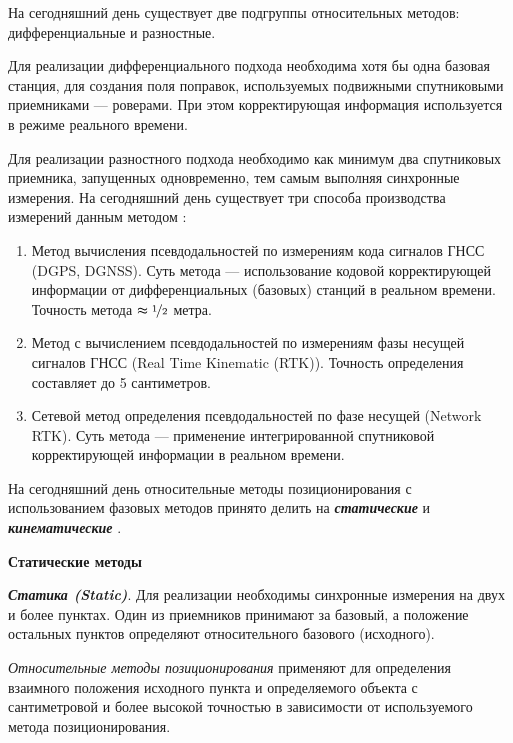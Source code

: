 На сегодняшний день существует две подгруппы относительных методов: дифференциальные и разностные. 

Для реализации дифференциального подхода необходима хотя бы одна базовая станция, для создания поля поправок, используемых подвижными спутниковыми приемниками --- роверами. При этом корректирующая информация используется в режиме реального времени.

Для реализации разностного подхода необходимо как минимум два спутниковых приемника, запущенных одновременно, тем самым выполняя синхронные измерения. На сегодняшний день существует три способа производства измерений данным методом \cite{src12, src21, src45}: 
\begin{enumerate}[beginpenalty=10000] %
	\item Метод вычисления псевдодальностей по измерениям кода сигналов ГНСС (DGPS, DGNSS). Суть метода --- использование кодовой корректирующей информации от дифференциальных (базовых) станций в реальном времени. Точность метода $\thickapprox\nicefrac{1}{2}$ метра. 
	\item Метод с вычислением псевдодальностей по измерениям фазы несущей сигналов ГНСС (Real Time Kinematic (RTK)). Точность определения составляет до 5 сантиметров. 
	\item Сетевой метод определения псевдодальностей по фазе несущей (Network RTK). Суть метода --- применение интегрированной спутниковой корректирующей информации в реальном времени.
\end{enumerate}

На сегодняшний день относительные методы позиционирования с использованием фазовых методов принято делить на \textbf{\textit{статические}} и \textbf{\textit{кинематические}} \cite{src02, src10, src16}.

\textbf{Статические методы}

\textbf{\textit{Статика (Static)}}. Для реализации необходимы синхронные измерения на двух и более пунктах. Один из приемников принимают за базовый, а положение остальных пунктов определяют относительного базового (исходного).

\textit{Относительные методы позиционирования} применяют для определения взаимного положения исходного пункта и определяемого объекта с сантиметровой и более высокой точностью в зависимости от используемого метода позиционирования.

